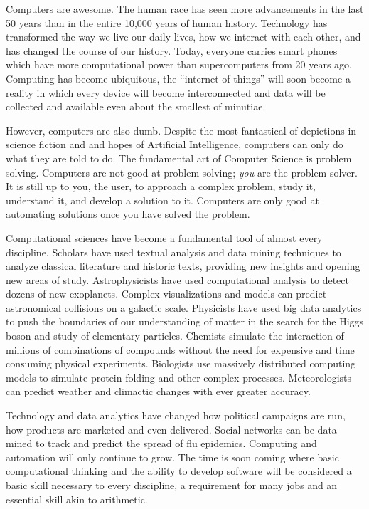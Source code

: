 

Computers are awesome.  The human race has seen more advancements in the 
last 50 years than in the entire 10,000 years of human history.  Technology has
transformed the way we live our daily lives, how we interact with each other, and
has changed the course of our history.  Today, everyone carries smart phones
which have more computational power than supercomputers from 20 years ago.
Computing has become ubiquitous, the ``internet of things'' will soon become
a reality in which every device will become interconnected and data will be collected
and available even about the smallest of minutiae.

However, computers are also dumb.  Despite the most fantastical of depictions
in science fiction and and hopes of Artificial Intelligence, computers can only do 
what they are told to do.  The fundamental art of Computer Science is problem 
solving.  Computers are not good at problem solving; \emph{you} are the problem 
solver.  It is still up to you, the user, to approach a complex problem, study it, 
understand it, and develop a solution to it.  Computers are only good at automating 
solutions once you have solved the problem.

Computational sciences have become a fundamental tool of almost every
discipline.  Scholars have used textual analysis and data mining techniques to
analyze classical literature and historic texts, providing new insights and opening
new areas of study.  Astrophysicists have used computational analysis to
detect dozens of new exoplanets.  Complex visualizations and models can 
predict astronomical collisions on a galactic scale.  Physicists have used big 
data analytics to push the boundaries of our understanding of matter in the 
search for the Higgs boson and study of elementary particles.  Chemists 
simulate the interaction of millions of combinations of compounds without
the need for expensive and time consuming physical experiments.  
Biologists use massively distributed computing models to simulate 
protein folding and other complex processes.  Meteorologists can 
predict weather and climactic changes with ever greater accuracy.

Technology and data analytics have changed how political campaigns
are run, how products are marketed and even delivered.
Social networks can be data mined to track and predict the spread of flu
epidemics.  Computing and automation will only continue to grow.
The time is soon coming where basic computational thinking and the 
ability to develop software will be considered a basic skill necessary 
to every discipline, a requirement for many jobs and an 
essential skill akin to arithmetic.

